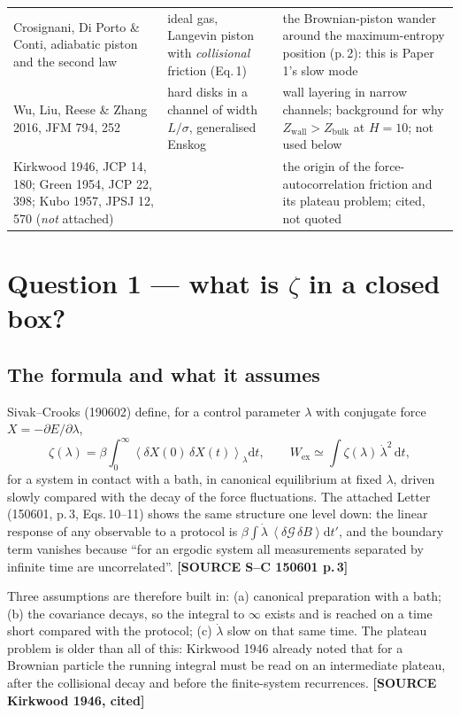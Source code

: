 \documentclass[11pt,a4paper]{article}
\newcommand{\avg}[1]{\left\langle #1 \right\rangle}
\newcommand{\dd}{\mathrm{d}}
\newcommand{\src}[1]{\textcolor{OliveGreen}{\textbf{[SOURCE #1]}}}
\begin{document}
\begin{center}
\begin{tabular}{@{}p{4.6cm}p{5.2cm}p{5.6cm}@{}}
Crosignani, Di Porto \& Conti, adiabatic piston and the second law & ideal gas, Langevin piston with \emph{collisional} friction (Eq.\,1) & the Brownian-piston wander around the maximum-entropy position (p.\,2): this is Paper 1's slow mode \\
Wu, Liu, Reese \& Zhang 2016, JFM 794, 252 & hard disks in a channel of width $L/\sigma$, generalised Enskog & wall layering in narrow channels; background for why $Z_{\mathrm{wall}} > Z_{\mathrm{bulk}}$ at $H = 10$; not used below \\
Kirkwood 1946, JCP 14, 180; Green 1954, JCP 22, 398; Kubo 1957, JPSJ 12, 570 (\emph{not} attached) & & the origin of the force-autocorrelation friction and its plateau problem; cited, not quoted \\
\bottomrule
\end{tabular}
\end{center}

\section{Question 1 --- what is $\zeta$ in a closed box?}

\subsection{The formula and what it assumes}
Sivak--Crooks (190602) define, for a control parameter $\lambda$ with conjugate force $X = -\partial E/\partial\lambda$,
\begin{equation}
\zeta(\lambda) = \beta\int_0^\infty \avg{\delta X(0)\,\delta X(t)}_\lambda \dd t,
\qquad
W_{\mathrm{ex}} \simeq \int \zeta(\lambda)\,\dot\lambda^2\,\dd t ,
\label{eq:SC}
\end{equation}
for a system in contact with a bath, in canonical equilibrium at fixed $\lambda$, driven slowly compared with the decay of the force fluctuations. The attached Letter (150601, p.\,3, Eqs.\,10--11) shows the same structure one level down: the linear response of any observable to a protocol is $\beta\int \dot\lambda\,\avg{\delta\mathcal G\,\delta B}\dd t'$, and the boundary term vanishes because ``for an ergodic system all measurements separated by infinite time are uncorrelated''. \src{S--C 150601 p.\,3}

Three assumptions are therefore built in: (a) canonical preparation with a bath; (b) the covariance decays, so the integral to $\infty$ exists and is reached on a time short compared with the protocol; (c) $\dot\lambda$ slow on that same time. The plateau problem is older than all of this: Kirkwood 1946 already noted that for a Brownian particle the running integral must be read on an intermediate plateau, after the collisional decay and before the finite-system recurrences. \src{Kirkwood 1946, cited}
\end{document}
